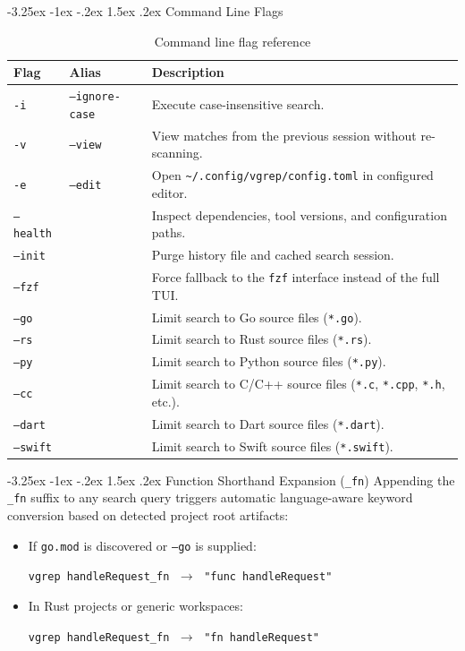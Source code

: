 \documentclass[11pt,a4paper]{article}
\makeatletter
\renewcommand{\subsection}{\@startsection{subsection}{2}{\z@}%
  {-3.25ex \@plus -1ex \@minus -.2ex}%
  {1.5ex \@plus .2ex}%
  {\normalfont\large\bfseries\color{RoyalBlue}}}
\makeatother
\begin{document}
\subsection{Command Line Flags}
\begin{table}[h!]
\centering
\small
\begin{tabularx}{\textwidth}{llX}
\toprule
\textbf{Flag} & \textbf{Alias} & \textbf{Description} \\
\midrule
\texttt{-i} & \texttt{--ignore-case} & Execute case-insensitive search. \\
\texttt{-v} & \texttt{--view} & View matches from the previous session without re-scanning. \\
\texttt{-e} & \texttt{--edit} & Open \texttt{\textasciitilde/.config/vgrep/config.toml} in configured editor. \\
\texttt{--health} & & Inspect dependencies, tool versions, and configuration paths. \\
\texttt{--init} & & Purge history file and cached search session. \\
\texttt{--fzf} & & Force fallback to the \texttt{fzf} interface instead of the full TUI. \\
\midrule
\texttt{--go} & & Limit search to Go source files (\texttt{*.go}). \\
\texttt{--rs} & & Limit search to Rust source files (\texttt{*.rs}). \\
\texttt{--py} & & Limit search to Python source files (\texttt{*.py}). \\
\texttt{--cc} & & Limit search to C/C++ source files (\texttt{*.c}, \texttt{*.cpp}, \texttt{*.h}, etc.). \\
\texttt{--dart} & & Limit search to Dart source files (\texttt{*.dart}). \\
\texttt{--swift} & & Limit search to Swift source files (\texttt{*.swift}). \\
\bottomrule
\end{tabularx}
\caption{Command line flag reference}
\end{table}

\subsection{Function Shorthand Expansion (\texttt{\_fn})}
Appending the \texttt{\_fn} suffix to any search query triggers automatic language-aware keyword conversion based on detected project root artifacts:
\begin{itemize}[leftmargin=1.5em]
    \item If \texttt{go.mod} is discovered or \texttt{--go} is supplied:
    \begin{center}
    \texttt{vgrep handleRequest\_fn} $\;\longrightarrow\;$ \texttt{"func handleRequest"}
    \end{center}
    \item In Rust projects or generic workspaces:
    \begin{center}
    \texttt{vgrep handleRequest\_fn} $\;\longrightarrow\;$ \texttt{"fn handleRequest"}
    \end{center}
\end{itemize}
\end{document}
